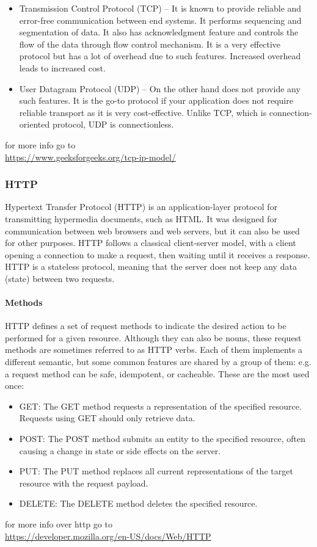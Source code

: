 \documentclass[a4paper,twoside, 12pt]{report}
\theoremstyle{break}
\begin{document}
\begin{enumerate}
\begin{itemize}
          \item Transmission Control Protocol (TCP) – It is known to provide reliable and error-free communication between end systems. It performs sequencing and segmentation of data. It also has acknowledgment feature and controls the flow of the data through flow control mechanism. It is a very effective protocol but has a lot of overhead due to such features. Increased overhead leads to increased cost.

          \item User Datagram Protocol (UDP) – On the other hand does not provide any such features. It is the go-to protocol if your application does not require reliable transport as it is very cost-effective. Unlike TCP, which is connection-oriented protocol, UDP is connectionless.
        \end{itemize}
\end{enumerate}
for more info go to\\
\url{https://www.geeksforgeeks.org/tcp-ip-model/}
\subsubsection{HTTP}
Hypertext Transfer Protocol (HTTP) is an application-layer protocol for transmitting hypermedia documents, such as HTML. It was designed for communication between web browsers and web servers, but it can also be used for other purposes. HTTP follows a classical client-server model, with a client opening a connection to make a request, then waiting until it receives a response. HTTP is a stateless protocol, meaning that the server does not keep any data (state) between two requests.
\paragraph{Methods}
HTTP defines a set of request methods to indicate the desired action to be performed for a given resource. Although they can also be nouns, these request methods are sometimes referred to as HTTP verbs. Each of them implements a different semantic, but some common features are shared by a group of them: e.g. a request method can be safe, idempotent, or cacheable. These are the most used once:

\begin{itemize}
  \item GET: The GET method requests a representation of the specified resource. Requests using GET should only retrieve data.
  \item POST: The POST method submits an entity to the specified resource, often causing a change in state or side effects on the server.
  \item PUT: The PUT method replaces all current representations of the target resource with the request payload.
  \item DELETE: The DELETE method deletes the specified resource.
\end{itemize}
for more info over http go to\\
\url{https://developer.mozilla.org/en-US/docs/Web/HTTP}
\end{document}
